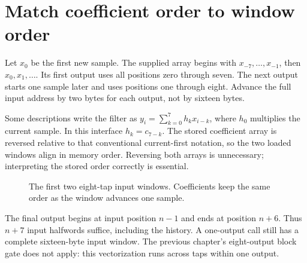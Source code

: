 \section{Match coefficient order to window order}
Let \(x_0\) be the first new sample. The supplied array begins with
\(x_{-7},\ldots,x_{-1}\), then \(x_0,x_1,\ldots\). Its first output uses all
positions zero through seven. The next output starts one sample later and uses
positions one through eight. Advance the full input address by two bytes for each
output, not by sixteen bytes.

Some descriptions write the filter as \(y_i=\sum_{k=0}^{7}h_kx_{i-k}\), where
\(h_0\) multiplies the current sample. In this interface \(h_k=c_{7-k}\).
The stored coefficient array is reversed relative to that conventional current-first
notation, so the two loaded windows align in memory order. Reversing both arrays is
unnecessary; interpreting the stored order correctly is essential.

\begin{figure}[htbp]
  \centering
  \caption{The first two eight-tap input windows. Coefficients keep the same order as the window advances one sample.}
\end{figure}

The final output begins at input position \(n-1\) and ends at position \(n+6\).
Thus \(n+7\) input halfwords suffice, including the history. A one-output call still
has a complete sixteen-byte input window. The previous chapter's eight-output block
gate does not apply: this vectorization runs across taps within one output.
